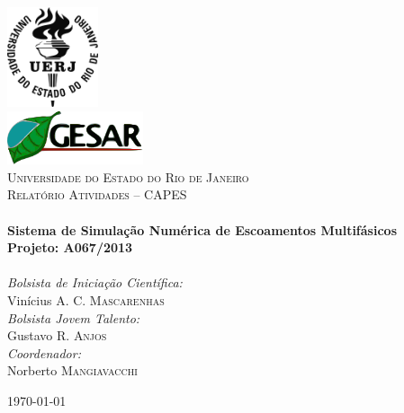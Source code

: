 \typeout{ ====================================================================}
\typeout{ ====================================================================}

\begin{titlepage}
\begin{center}

\includegraphics[width=0.2\textwidth]{./figs/uerj.png}~\\[1cm]
\includegraphics[width=0.3\textwidth]{./figs/gesar.png}~\\[1cm]

\textsc{\LARGE Universidade do Estado do Rio de Janeiro}\\[1.5cm]

\textsc{\Large Relatório Atividades -- CAPES}\\[0.5cm]

\HRule \\[0.4cm]
{ \huge \bfseries Sistema de Simulação Numérica de Escoamentos
Multifásicos\\[0.4cm] }
{ \Large \bfseries Projeto: A067/2013\\[0.4cm] }
\HRule \\[1.0cm]

\noindent
\large
\emph{Bolsista de Iniciação Científica:}\\
Vinícius A. C. \textsc{Mascarenhas}\\
\vspace{0.3cm}
\emph{Bolsista Jovem Talento:}\\
Gustavo R. \textsc{Anjos}\\
\vspace{0.3cm}
\emph{Coordenador:}\\
Norberto \textsc{Mangiavacchi}\\
\vfill

{\large \today}

\end{center}
\end{titlepage}


